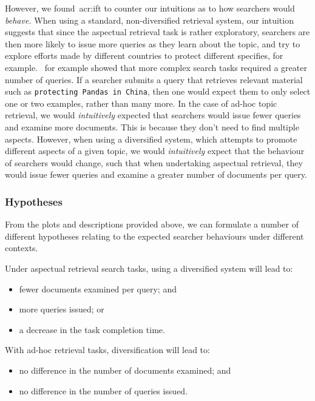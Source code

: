 However, we found~\gls{acr:ift} to counter our intuitions as to how searchers would \emph{behave.} When using a standard, non-diversified retrieval system, our intuition suggests that since the aspectual retrieval task is rather exploratory, searchers are then more likely to issue more queries as they learn about the topic, and try to explore efforts made by different countries to protect different specifies, for example.~\cite{kelly2015search_tasks} for example showed that more complex search tasks required a greater number of queries. If a searcher submits a query that retrieves relevant material such as \texttt{protecting Pandas in China}, then one would expect them to only select one or two examples, rather than many more. In the case of ad-hoc topic retrieval, we would \emph{intuitively} expected that searchers would issue fewer queries and examine more documents. This is because they don't need to find multiple aspects. However, when using a diversified system, which attempts to promote different aspects of a given topic, we would \emph{intuitively} expect that the behaviour of searchers would change, such that when undertaking aspectual retrieval, they would issue fewer queries and examine a greater number of documents per query.

\subsubsection{Hypotheses}\label{sec:diversity:background:tasks:hypotheses}
From the plots and descriptions provided above, we can formulate a number of different hypotheses relating to the expected searcher behaviours under different contexts.

Under aspectual retrieval search tasks, using a diversified system will lead to:
\begin{itemize}
    \item{ fewer documents examined per query; and}
    \item{ more queries issued; or}
    \item{ a decrease in the task completion time.}
\end{itemize}

With ad-hoc retrieval tasks, diversification will lead to:
\begin{itemize}
    \item{ no difference in the number of documents examined; and}
    \item{ no difference in the number of queries issued.}
\end{itemize}

